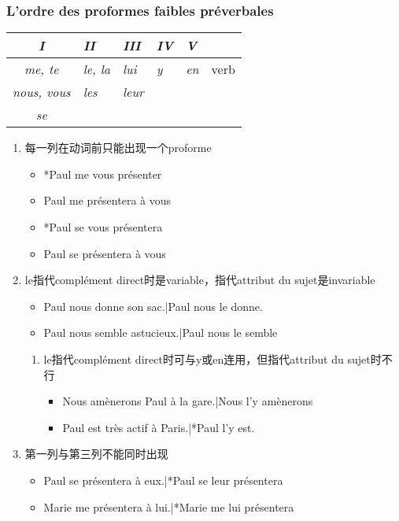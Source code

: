 \documentclass[UTF8]{report}
\begin{document}
\subsubsection{L’ordre des proformes faibles préverbales}
\begin{table}[H]
\centering
\renewcommand{\arraystretch}{1.5}
\begin{tabular}{|>{\itshape}c|>{\itshape}l|>{\itshape}l|>{\itshape}l|>{\itshape}l|l|}
\hline
\textbf{I} & \textbf{II} & \textbf{III} & \textbf{IV} & \textbf{V} &  \\
\hline
me, te & le, la & lui & y & en & verb \\
nous, vous & les & leur & & & \\
se & & & & & \\
\cline{1-5}
\hline
\end{tabular}
\end{table}

\begin{enumerate}
    \item 每一列在动词前只能出现一个proforme
    \begin{itemize}
        \item *Paul me vous présenter
        \item Paul me présentera à vous
        \item *Paul se vous présentera
        \item Paul se présentera à vous
    \end{itemize}
    \item le指代complément direct时是variable，指代attribut du sujet是invariable
    \begin{itemize}
        \item Paul nous donne son sac.|Paul nous le donne.
        \item Paul nous semble astucieux.|Paul nous le semble
    \end{itemize}
    \begin{enumerate}
        \item le指代complément direct时可与y或en连用，但指代attribut du sujet时不行
        \begin{itemize}
            \item Nous amènerons Paul à la gare.|Nous l’y amènerons
            \item Paul est très actif à Paris.|*Paul l’y est.
        \end{itemize}
    \end{enumerate}
    \item 第一列与第三列不能同时出现
    \begin{itemize}
        \item Paul se présentera à eux.|*Paul se leur présentera
        \item Marie me présentera à lui.|*Marie me lui présentera
    \end{itemize}
\end{enumerate}
\end{document}
